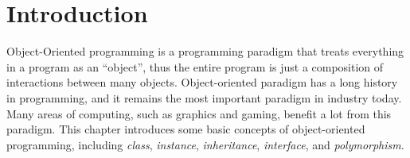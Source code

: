 \documentclass[../main.tex]{subfiles}
\begin{document}
\section{Introduction}
Object-Oriented programming is a programming paradigm that treats everything in
a program as an ``object'', thus the entire program is just a composition of
interactions between many objects. Object-oriented paradigm has a long history
in programming, and it remains the most important paradigm in industry today.
Many areas of computing, such as graphics and gaming, benefit a lot from this
paradigm. This chapter introduces some basic concepts of object-oriented programming,
including \emph{class}, \emph{instance}, \emph{inheritance}, \emph{interface},
and \emph{polymorphism}.
\end{document}
